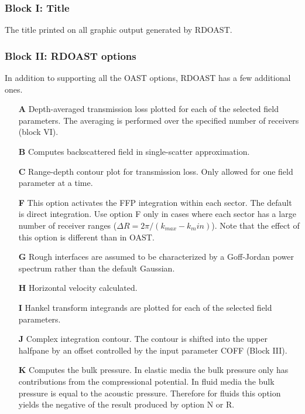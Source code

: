 
\subsubsection{Block I: Title}

The title printed on all graphic output generated by RDOAST.

\subsubsection{Block II: RDOAST options}

In addition to supporting all the OAST options, RDOAST has a few
additional ones.
\begin{itemize}
	     \item[{\bf A}] Depth-averaged transmission loss plotted
		for each of the selected field parameters. 
		The averaging is performed over
		the specified number of receivers (block VI).
	\item[{\bf B}] Computes backscattered field in single-scatter
		approximation. 
	     \item[{\bf C}] Range-depth contour plot for transmission
                loss. Only allowed for one field parameter
		at a time.
    \item[{\bf F}] This option activates the FFP integration within
each sector. The default is direct integration. Use option F only in
cases where each sector has a large number of receiver ranges ($\Delta
R = 2 \pi /(k_{max}-k_min) $). Note that the effect of this option is different
than in OAST. 
    \item[{\bf G}] Rough interfaces are assumed to be characterized by
a Goff-Jordan power spectrum rather than the default Gaussian. 
	     \item[{\bf H}] Horizontal velocity calculated.
	     \item[{\bf I}] Hankel transform integrands are plotted
		for each of the selected field parameters.
	     \item[{\bf J}]	Complex integration contour. The contour is shifted
		into the upper halfpane by an offset controlled by the 
		input parameter COFF (Block III).
\item[{\bf K}]
      Computes the bulk pressure. In elastic media the bulk pressure only
      has contributions from the compressional potential. In fluid
      media the bulk pressure is equal to the acoustic pressure.
      Therefore for fluids this option yields the negative of the result
      produced by option N or R.  


\end{itemize}
